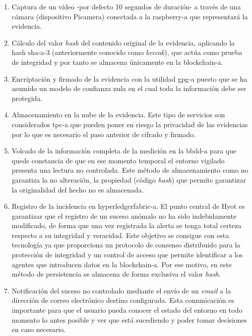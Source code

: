 \documentclass[12pt,a4paper, twoside]{report}
\begin{document}
	\begin{enumerate}
		\item Captura de un vídeo -por defecto 10 segundos de duración- a través de una cámara (dispositivo Picamera) conectada a la \gls{raspberry-a} que representará la evidencia.
		\item Cálculo del valor \textit{hash} del contenido original de la evidencia, aplicando la \gls{hash} \gls{sha-a}-3 (anteriormente conocido como \textit{keccak}), que actúa como prueba de integridad y por tanto se almacena únicamente en la \gls{blockchain-a}. 
		\item Encriptación y firmado de la evidencia con la utilidad \gls{gpg-a} puesto que se ha asumido un modelo de confianza nula en el cual toda la información debe ser protegida.
		\item Almacenamiento en la nube de la evidencia. Este tipo de servicios son considerados \gls{tpc-a} que pueden poner en riesgo la privacidad de las evidencias por lo que es necesario el paso anterior de cifrado y firmado.	
		\item Volcado de la información completa de la medición en la \gls{bbdd-a} para que quede constancia de que en ese momento temporal el entorno vigilado presenta una lectura no controlada. Este método de almacenamiento como no garantiza la no alteración, la propiedad (código \textit{hash}) que permite garantizar la originalidad del hecho no es almacenada.
		\item Registro de la incidencia	en \gls{hyperledgerfabric-a}. El punto central de Hyot es garantizar que el registro de un suceso anómalo no ha sido indebidamente modificado, de forma que una vez registrada la alerta se tenga total certeza respecto a su integridad y veracidad. Este objetivo se consigue con esta tecnología ya que proporciona un protocolo de consenso distribuido para la protección de integridad y un control de acceso que permite identificar a los agentes que introducen datos en la \Gls{blockchain-a}. Por ese motivo, en este método de persistencia se almacena de forma exclusiva el valor \textit{hash}.
		\item Notificación del suceso no controlado mediante el envío de un \textit{email} a la dirección de correo electrónico destino configurada. Esta comunicación es importante para que el usuario pueda conocer el estado del entorno en todo momento lo antes posible y ver que está sucediendo y poder tomar decisiones en caso necesario.
	
	\end{enumerate}
			
\end{document}
